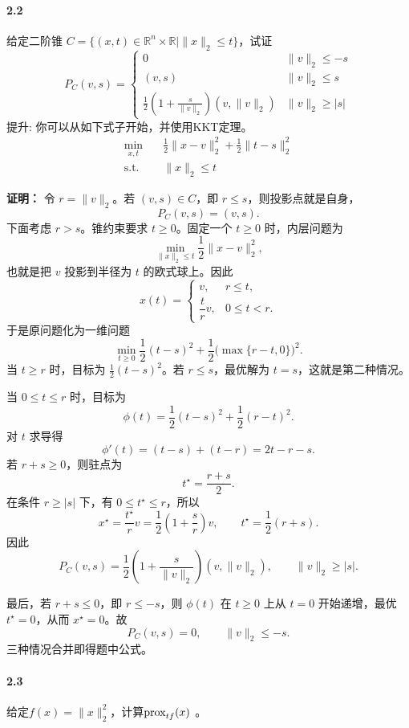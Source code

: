 \documentclass[12pt,a4paper]{article}
\begin{document}
\paragraph{2.2}给定二阶锥 $C=\{(x,t)\in \mathbb R^n\times \mathbb{R}\mid\|x\|_2\le t\}$，试证
$$P_C(v,s)=\left\{\begin{array}{ll}0&\|v\|_2\le-s\\
(v,s)&\|v\|_2\le s\\
\frac{1}{2}(1+\frac{s}{\|v\|_2})(v,\|v\|_2)&\|v\|_2\ge|s|
\end{array}\right. $$
提升: 你可以从如下式子开始，并使用KKT定理。
\begin{align*}
\min_{x,t}\quad & \frac{1}{2} \|x-v\|^2_2+\frac{1}{2} \|t-s\|^2_2 \\
\text{s.t.} \quad & \|x\|_2\leq t
\end{align*}

\textbf{证明：}
令 $r=\|v\|_2$。若 $(v,s)\in C$，即 $r\leq s$，则投影点就是自身，
\[
  P_C(v,s)=(v,s).
\]
下面考虑 $r>s$。锥约束要求 $t\geq0$。固定一个 $t\geq0$ 时，内层问题为
\[
  \min_{\|x\|_2\leq t}\frac12\|x-v\|_2^2,
\]
也就是把 $v$ 投影到半径为 $t$ 的欧式球上。因此
\[
  x(t)=
  \begin{cases}
    v, & r\leq t,\\
    \dfrac{t}{r}v, & 0\leq t<r.
  \end{cases}
\]
于是原问题化为一维问题
\[
  \min_{t\geq0}
  \frac12(t-s)^2+\frac12\bigl(\max\{r-t,0\}\bigr)^2.
\]
当 $t\geq r$ 时，目标为 $\frac12(t-s)^2$。若 $r\leq s$，最优解为 $t=s$，这就是第二种情况。

当 $0\leq t\leq r$ 时，目标为
\[
  \phi(t)
  =\frac12(t-s)^2+\frac12(r-t)^2.
\]
对 $t$ 求导得
\[
  \phi'(t)=(t-s)+(t-r)=2t-r-s.
\]
若 $r+s\geq0$，则驻点为
\[
  t^\star=\frac{r+s}{2}.
\]
在条件 $r\geq |s|$ 下，有 $0\leq t^\star\leq r$，所以
\[
  x^\star=\frac{t^\star}{r}v
  =\frac12\left(1+\frac{s}{r}\right)v,
  \qquad
  t^\star=\frac12(r+s).
\]
因此
\[
  P_C(v,s)
  =
  \frac12\left(1+\frac{s}{\|v\|_2}\right)
  (v,\|v\|_2),
  \qquad \|v\|_2\geq |s|.
\]

最后，若 $r+s\leq0$，即 $r\leq -s$，则 $\phi(t)$ 在 $t\geq0$ 上从 $t=0$ 开始递增，最优 $t^\star=0$，从而 $x^\star=0$。故
\[
  P_C(v,s)=0,
  \qquad \|v\|_2\leq -s.
\]
三种情况合并即得题中公式。

\paragraph{2.3} 给定$f(x)=\|x\|_2^2$，计算${\rm prox}_{tf}(x)$ 。
\end{document}
